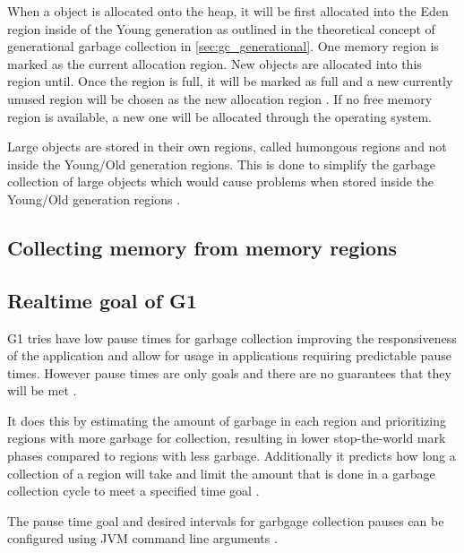 When a object is allocated onto the heap, it will be first allocated into the
Eden region inside of the Young generation as outlined in the theoretical concept
of generational garbage collection in \autoref{sec:gc_generational}.
One memory region is marked as the current allocation region.
New objects are allocated into this region until.
Once the region is full, it will be marked as full and a new currently unused region will be
chosen as the new allocation region \cite[2.1 Allocation]{java_g1_2004}.
If no free memory region is available, a new one will be allocated through the operating system.


Large objects are stored in their own regions, called humongous regions
and not inside the Young/Old generation regions.
This is done to simplify the garbage collection of large objects which
would cause problems when stored inside the Young/Old generation regions \cite[2.1 Heap Layout]{java_g1_2004}.

\subsection{Collecting memory from memory regions}


\subsection{Realtime goal of G1}

G1 tries have low pause times for garbage collection improving the
responsiveness of the application and allow for usage in applications
requiring predictable pause times. However pause times are only goals
and there are no guarantees that they will be met
\cite[3.2 Satisfying a Soft Real-Time Goal]{java_g1_2004}.

It does this by estimating the amount of garbage in each region and
prioritizing regions with more garbage for collection, resulting in lower stop-the-world mark phases
compared to regions with less garbage. %
Additionally it predicts how long a collection of a region will take and
limit the amount that is done in a garbage collection cycle to meet a
specified time goal \cite[3.2.1 Predicting Evacuation Pause Times]{java_g1_2004}.

The pause time goal and desired intervals for garbgage collection pauses can be configured using
JVM command line arguments \cite[Ergonomic Defaults for G1 GC]{java_g1_getting_started}.


